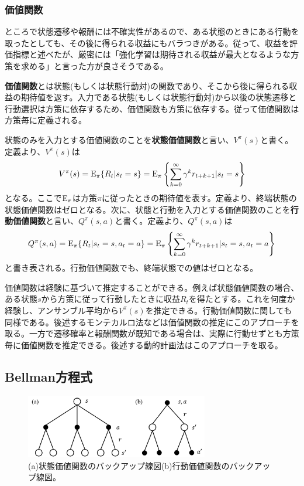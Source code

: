 \documentclass[dvipdfmx, 9pt, a4paper]{jsarticle}
\numberwithin{equation}{section}
\begin{document}
\subsubsection{価値関数}
ところで状態遷移や報酬には不確実性があるので、ある状態のときにある行動を取ったとしても、その後に得られる収益にもバラつきがある。従って、収益を評価指標と述べたが、厳密には「強化学習は期待される収益が最大となるような方策を求める」と言った方が良さそうである。\par
{\bf 価値関数}とは状態(もしくは状態行動対)の関数であり、そこから後に得られる収益の期待値を返す。入力である状態(もしくは状態行動対)から以後の状態遷移と行動選択は方策に依存するため、価値関数も方策に依存する。従って価値関数は方策毎に定義される。\par
状態のみを入力とする価値関数のことを{\bf 状態価値関数}と言い、$V^\pi(s)$と書く。定義より、$V^\pi(s)$は
\begin{equation}
V^\pi(s)={\rm E}_\pi\{R_t|s_t=s\}={\rm E}_\pi\left\{ \sum_{k=0}^\infty \gamma^kr_{t+k+1}|s_t=s \right\}
\end{equation}
となる。ここで${\rm E}_\pi$は方策$\pi$に従ったときの期待値を表す。定義より、終端状態の状態価値関数はゼロとなる。次に、状態と行動を入力とする価値関数のことを{\bf 行動価値関数}と言い、$Q^\pi(s, a)$と書く。定義より、$Q^\pi(s, a)$は
\begin{equation}
Q^\pi(s, a)={\rm E}_\pi\{R_t|s_t=s, a_t=a\}={\rm E}_\pi\left\{ \sum_{k=0}^\infty \gamma^kr_{t+k+1}|s_t=s, a_t=a \right\}
\end{equation}
と書き表される。行動価値関数でも、終端状態での値はゼロとなる。\par
価値関数は経験に基づいて推定することができる。例えば状態価値関数の場合、ある状態$s$から方策に従って行動したときに収益$R_t$を得たとする。これを何度か経験し、アンサンブル平均から$V^\pi(s)$を推定できる。行動価値関数に関しても同様である。後述するモンテカルロ法などは価値関数の推定にこのアプローチを取る。一方で遷移確率と報酬関数が既知である場合は、実際に行動せずとも方策毎に価値関数を推定できる。後述する動的計画法はこのアプローチを取る。

\subsection{Bellman方程式}
\begin{figure}[t]
\begin{center}
\includegraphics[width=8cm]{fig1_2.png}
\caption{(a)状態価値関数のバックアップ線図(b)行動価値関数のバックアップ線図。}
\end{center}
\end{figure}
\end{document}
